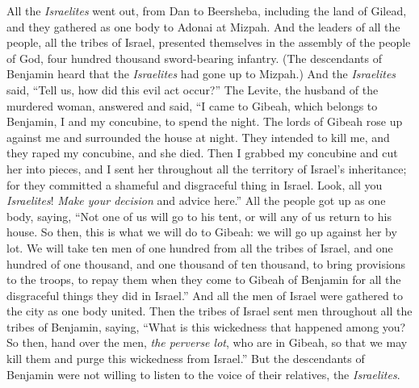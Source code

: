 \begin{biblechapter} %
 All the \textit{Israelites} went out, from Dan to Beersheba, including the land of Gilead, and they gathered as one body to Adonai at Mizpah.
\verse And the leaders of all the people, all the tribes of Israel, presented themselves in the assembly of the people of God, four hundred thousand sword-bearing infantry.
\verse (The descendants of Benjamin heard that the \textit{Israelites} had gone up to Mizpah.) And the \textit{Israelites} said, “Tell us, how did this evil act occur?”
\verse The Levite, the husband of the murdered woman, answered and said, “I came to Gibeah, which belongs to Benjamin, I and my concubine, to spend the night.
\verse The lords of Gibeah rose up against me and surrounded the house at night. They intended to kill me, and they raped my concubine, and she died.
\verse Then I grabbed my concubine and cut her into pieces, and I sent her throughout all the territory of Israel’s inheritance; for they committed a shameful and disgraceful thing in Israel.
\verse Look, all you \textit{Israelites}! \textit{Make your decision} and advice here.”
\verse All the people got up as one body, saying, “Not one of us will go to his tent, or will any of us return to his house.
\verse So then, this is what we will do to Gibeah: we will go up against her by lot.
\verse We will take ten men of one hundred from all the tribes of Israel, and one hundred of one thousand, and one thousand of ten thousand, to bring provisions to the troops, to repay them when they come to Gibeah of Benjamin for all the disgraceful things they did in Israel.”
\verse And all the men of Israel were gathered to the city as one body united.
\verse Then the tribes of Israel sent men throughout all the tribes of Benjamin, saying, “What is this wickedness that happened among you?
\verse So then, hand over the men, \textit{the perverse lot}, who are in Gibeah, so that we may kill them and purge this wickedness from Israel.” But the descendants of Benjamin were not willing to listen to the voice of their relatives, the \textit{Israelites}.

\end{biblechapter}
